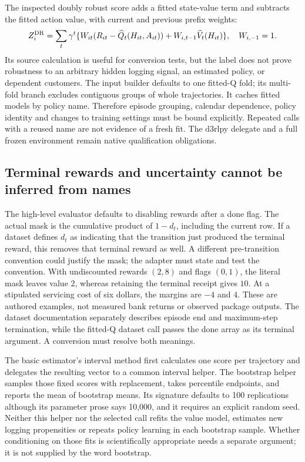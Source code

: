 The inspected doubly robust score adds a fitted state-value term and subtracts
the fitted action value, with current and previous prefix weights:
\[
 Z_i^{\rm DR}=\sum_t\gamma^t
 \{W_{it}(R_{it}-\widehat Q_t(H_{it},A_{it}))
       +W_{i,t-1}\widehat V_t(H_{it})\},\quad W_{i,-1}=1.
\]
Its source calculation is useful for conversion tests, but the label does not
prove robustness to an arbitrary hidden logging signal, an estimated policy,
or dependent customers. The input builder defaults to one fitted-Q fold; its
multi-fold branch excludes contiguous groups of whole trajectories. It caches
fitted models by policy name. Therefore episode grouping, calendar dependence,
policy identity and changes to training settings must be bound explicitly.
Repeated calls with a reused name are not evidence of a fresh fit. The d3rlpy
delegate and a full frozen environment remain native qualification obligations.
\cite{exec23_scope_rl_sources}

\subsection{Terminal rewards and uncertainty cannot be inferred from names}
\label{exec23:scope-rl-uncertainty}
The high-level evaluator defaults to disabling rewards after a done flag. The
actual mask is the cumulative product of $1-d_t$, including the current row.
If a dataset defines $d_t$ as indicating that the transition just produced the
terminal reward, this removes that terminal reward as well. A different
pre-transition convention could justify the mask; the adapter must state and
test the convention. With undiscounted rewards $(2,8)$ and flags $(0,1)$, the
literal mask leaves value $2$, whereas retaining the terminal receipt gives
$10$. At a stipulated servicing cost of six dollars, the margins are $-4$ and
$4$. These are authored examples, not measured bank returns or observed
package outputs. The dataset documentation separately describes episode end
and maximum-step termination, while the fitted-Q dataset call passes the done
array as its terminal argument. A conversion must resolve both meanings.
\cite{exec23_scope_rl_sources,exec23_scope_rl_reference}

The basic estimator's interval method first calculates one score per trajectory
and delegates the resulting vector to a common interval helper. The bootstrap
helper samples those fixed scores with replacement, takes percentile endpoints,
and reports the mean of bootstrap means. Its signature defaults to 100
replications although its parameter prose says 10,000, and it requires an
explicit random seed. Neither this helper nor the selected call refits the
value model, estimates new logging propensities or repeats policy learning in
each bootstrap sample. Whether conditioning on those fits is scientifically
appropriate needs a separate argument; it is not supplied by the word
bootstrap. \cite{exec23_scope_rl_sources}

